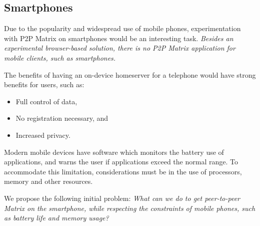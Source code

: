 \subsection{Smartphones}
Due to the popularity and widespread use of mobile phones, experimentation with \ac{P2P} Matrix on smartphones would be an interesting task.
\textit{Besides an experimental browser-based solution\cite{fosdem_event_p2p_matrix}, there is no \ac{P2P} Matrix application for mobile clients, such as smartphones.}

The benefits of having an on-device homeserver for a telephone would have strong benefits for users, such as:
\begin{itemize}
	\item Full control of data,
	\item No registration necessary, and
	\item Increased privacy.
\end{itemize}

\noindent
Modern mobile devices have software which monitors the battery use of applications, and warns the user if applications exceed the normal range.
To accommodate this limitation, considerations must be in the use of processors, memory and other resources.

\begin{center}
	We propose the following initial problem: \textit{What can we do to get peer-to-peer Matrix on the smartphone, while respecting the constraints of mobile phones, such as battery life and memory usage?}
\end{center}

